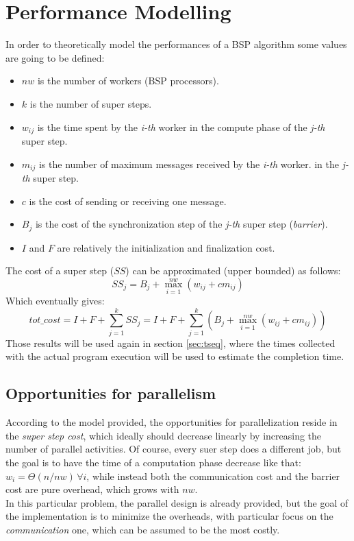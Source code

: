 \documentclass[]{article}
\begin{document}
\section{Performance Modelling}
\label{sec:perfModel}

In order to theoretically model the performances of a BSP algorithm some values are going to be defined:
\begin{itemize}
	\item $\mathit{nw}$ is the number of workers (BSP processors).
	\item $k$ is the number of super steps.
	\item $w_{ij}$ is the time spent by the \emph{i-th} worker in the compute phase of the \emph{j-th} super step.
	\item $m_{ij}$ is the number of maximum messages received by the \emph{i-th} worker. in the \emph{j-th} super step.
	\item $c$ is the cost of sending or receiving one message.
	\item $B_j$ is the cost of the synchronization step of the \emph{j-th} super step (\emph{barrier}).
	\item $I$ and $F$ are relatively the initialization and finalization cost.
\end{itemize}
The cost of a super step ($\mathit{SS}$) can be approximated (upper bounded) as follows:
$$ \mathit{SS}_j = B_j+ \max_{i=1}^{\mathit{nw}}(w_{ij} + c m_{ij})$$
Which eventually gives:
$$ \mathit{tot\_cost} = I +F+ \sum_{j=1}^{k} \mathit{SS}_j = I + F +\sum_{j=1}^{k} (B_j+ \max_{i=1}^{\mathit{nw}}(w_{ij} + c m_{ij})) $$ 
Those results will be used again in section \ref{sec:tseq}, where the times collected with the actual program execution will be used to estimate the completion time.

\subsection{Opportunities for parallelism}
According to the model provided, the opportunities for parallelization reside in the \emph{super step cost}, which ideally should decrease linearly by increasing the number of parallel activities. Of course, every suer step does a different job, but the goal is to have the time of a computation phase decrease like that: $w_i = \Theta(n/\mathit{nw}) \, \forall i$, while instead both the communication cost and the barrier cost are pure overhead, which grows with $\mathit{nw}$. \\
In this particular problem, the parallel design is already provided, but the goal of the implementation is to minimize the overheads, with particular focus on the \emph{communication} one, which can be assumed to be the most costly. \\
\end{document}
